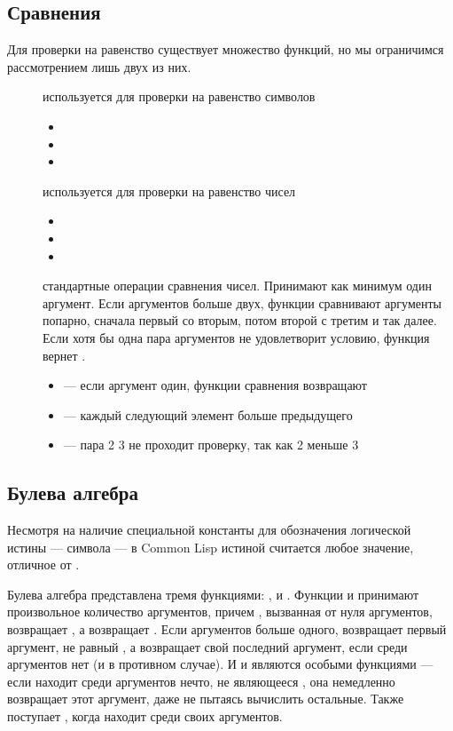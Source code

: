 \documentclass[a4paper, 12pt, titlepage, twoside]{article}
\newenvironment{examples}
               {\begin{itemize}\renewcommand{\labelitemi}{ }}
               {\end{itemize}}
\begin{document}
\subsection{Сравнения}
Для проверки на равенство существует множество функций, но мы ограничимся рассмотрением лишь двух из них.
\begin{description}
\item [] используется для проверки на равенство символов
  \begin{examples}
  \item {}
  \item {}
  \item {}
  \end{examples}
\item [\lisp{=}] используется для проверки на равенство чисел
  \begin{examples}
  \item {}
  \item {}
  \item {}
  \end{examples}
\item [\lisp{> < >= <=}] стандартные операции сравнения чисел. Принимают как минимум один аргумент. Если аргументов больше двух, функции сравнивают аргументы попарно, сначала первый со вторым, потом второй с третим и так далее. Если хотя бы одна пара аргументов не удовлетворит условию, функция вернет .
  \begin{examples}
  \item {} --- если аргумент один, функции сравнения возвращают 
  \item {} --- каждый следующий элемент больше предыдущего
  \item {} --- пара 2 3 не проходит проверку, так как 2 меньше 3
  \end{examples}
\end{description}
\subsection{Булева алгебра} %
Несмотря на наличие специальной константы для обозначения логической истины --- символа  --- в Common Lisp истиной считается любое значение, отличное от .

Булева алгебра представлена тремя функциями: ,  и . Функции  и  принимают произвольное количество аргументов, причем , вызванная от нуля аргументов, возвращает , а  возвращает . Если аргументов больше одного,  возвращает первый аргумент, не равный , а  возвращает свой последний аргумент, если среди аргументов нет  (и  в противном случае). И  и  являются особыми функциями --- если  находит среди аргументов нечто, не являющееся , она немедленно возвращает этот аргумент, даже не пытаясь вычислить остальные. Также поступает , когда находит  среди своих аргументов.
\end{document}
